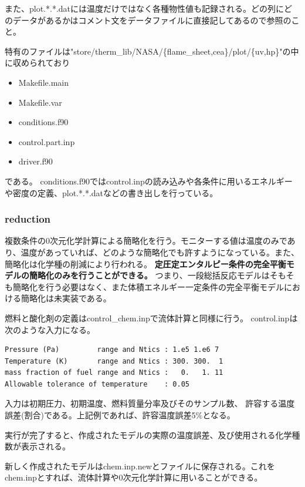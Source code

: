 \documentclass{jsarticle}
\begin{document}
また、plot.*.*.datには温度だけではなく各種物性値も記録される。どの列にどのデータがあるかはコメント文をデータファイルに直接記してあるので参照のこと。

\hspace{1em}

特有のファイルは"store/therm\_lib/NASA/\{flame\_sheet,cea\}/plot/\{uv,hp\}"の中に収められており
\begin{itemize}
\item Makefile.main
\item Makefile.var
\item conditions.f90
\item control.part.inp
\item driver.f90
\end{itemize}
である。
conditions.f90ではcontrol.inpの読み込みや各条件に用いるエネルギーや密度の定義、plot.*.*.datなどの書き出しを行っている。
\subsubsection{reduction}\label{NASA/reduction}%
複数条件の0次元化学計算による簡略化を行う。モニターする値は温度のみであり、温度があっていれば、どのような簡略化でも許すようになっている。また、簡略化は化学種の削減により行われる。
\textbf{定圧定エンタルピー条件の完全平衡モデルの簡略化のみを行うことができる。}
つまり、一段総括反応モデルはそもそも簡略化を行う必要はなく、また体積エネルギー一定条件の完全平衡モデルにおける簡略化は未実装である。

燃料と酸化剤の定義はcontrol\_chem.inpで流体計算と同様に行う。
control.inpは次のような入力になる。
\begin{verbatim}
Pressure (Pa)         range and Ntics : 1.e5 1.e6 7
Temperature (K)       range and Ntics : 300. 300.  1
mass fraction of fuel range and Ntics :   0.   1. 11
Allowable tolerance of temperature    : 0.05
\end{verbatim}
入力は初期圧力、初期温度、燃料質量分率及びそのサンプル数、
許容する温度誤差(割合)である。上記例であれば、許容温度誤差5\%となる。

実行が完了すると、作成されたモデルの実際の温度誤差、及び使用される化学種数が表示される。

新しく作成されたモデルはchem.inp.newとファイルに保存される。これをchem.inpとすれば、流体計算や0次元化学計算に用いることができる。
\end{document}
